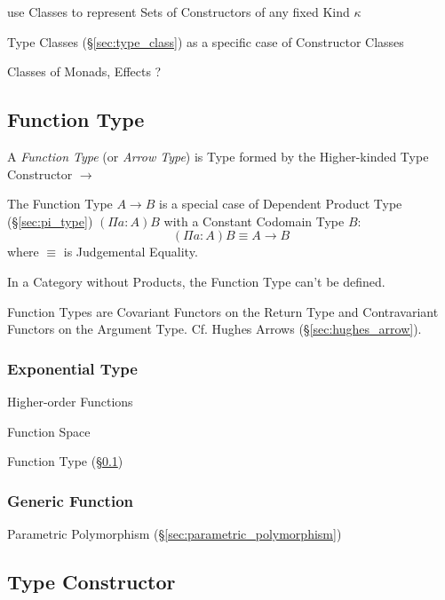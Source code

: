 use Classes to represent Sets of Constructors of any fixed Kind
$\kappa$

Type Classes (\S\ref{sec:type_class}) as a specific case of
Constructor Classes

Classes of Monads, Effects ?



\subsection{Function Type}\label{sec:function_type}

A \emph{Function Type} (or \emph{Arrow Type}) is Type formed by the
Higher-kinded Type Constructor $\rightarrow$

The Function Type $A \rightarrow B$ is a special case of Dependent
Product Type (\S\ref{sec:pi_type}) $(\Pi a:A)B$ with a Constant
Codomain Type $B$:
\[
  (\Pi a:A)B \equiv A \rightarrow B
\]
where $\equiv$ is Judgemental Equality.

In a Category without Products, the Function Type can't be defined.

Function Types are Covariant Functors on the Return Type and
Contravariant Functors on the Argument Type. Cf. Hughes Arrows
(\S\ref{sec:hughes_arrow}).



\subsubsection{Exponential Type}\label{sec:exponential_type}

Higher-order Functions

Function Space

Function Type (\S\ref{sec:function_type})



\subsubsection{Generic Function}\label{sec:generic_function}

Parametric Polymorphism (\S\ref{sec:parametric_polymorphism})



\subsection{Type Constructor}\label{sec:type_constructor}

